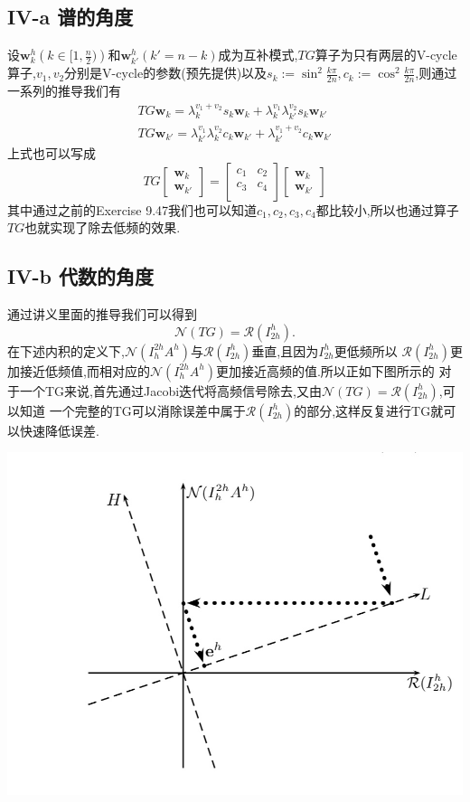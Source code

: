 \documentclass[twoside,a4paper]{article}
\begin{document}
\subsection*{IV-a 谱的角度}
\hspace{0.9em}
设$\mathbf{w}^h_k\left(k\in[1,\frac{n}{2})\right)$和$\mathbf{w}^h_{k'}(k'=n-k)$成为互补模式,$TG$算子为只有两层的V-cycle算子,$v_1,v_2$分别是V-cycle的参数(预先提供)以及$s_k:=\sin^2\frac{k\pi}{2n},c_k:=\cos^2\frac{k\pi}{2n}$,则通过一系列的推导我们有
\begin{align*}
    TG\mathbf{w}_k=\lambda_k^{v_1+v_2}s_k\mathbf{w}_k+\lambda_k^{v_1}\lambda_{k'}^{v_2}s_k\mathbf{w}_{k'} \\
    TG\mathbf{w}_{k'}=\lambda_{k'}^{v_1}\lambda_k^{v_2}c_k\mathbf{w}_{k'}+\lambda_{k'}^{v_1+v_2}c_k\mathbf{w}_{k'}
\end{align*}
上式也可以写成
\[
    TG\left[\begin{matrix}
            \mathbf{w}_k \\
            \mathbf{w}_{k'}
        \end{matrix}\right]
    =\left[\begin{matrix}
            c_1 & c_2 \\
            c_3 & c_4 \\
        \end{matrix}\right]
    \left[\begin{matrix}
            \mathbf{w}_k \\
            \mathbf{w}_{k'}
        \end{matrix}\right]
\]
其中通过之前的Exercise 9.47我们也可以知道$c_1,c_2,c_3,c_4$都比较小,所以也通过算子$TG$也就实现了除去低频的效果.

\subsection*{IV-b 代数的角度}
\hspace{0.9em}
通过讲义里面的推导我们可以得到
$$
    \mathcal{N}(TG)=\mathcal{R}(I^{h}_{2h}).
$$
在下述内积的定义下,$\mathcal{N}(I^{2h}_hA^h)$与$\mathcal{R}(I^{h}_{2h})$垂直,且因为$I^{h}_{2h}$更低频所以
$\mathcal{R}(I^{h}_{2h})$更加接近低频值,而相对应的$\mathcal{N}(I^{2h}_hA^h)$更加接近高频的值.所以正如下图所示的
对于一个TG来说,首先通过Jacobi迭代将高频信号除去,又由$\mathcal{N}(TG)=\mathcal{R}(I^{h}_{2h})$,可以知道
一个完整的TG可以消除误差中属于$\mathcal{R}(I^{h}_{2h})$的部分,这样反复进行TG就可以快速降低误差.


\begin{center}
    \includegraphics[scale=0.4]{../png/1.jpg}
\end{center}
\end{document}
